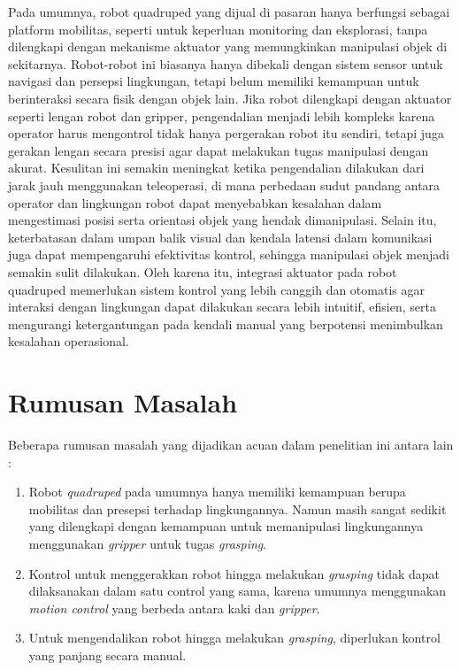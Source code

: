 Pada umumnya, robot quadruped yang dijual di pasaran hanya berfungsi sebagai platform mobilitas,
seperti untuk keperluan monitoring dan eksplorasi, tanpa dilengkapi dengan mekanisme aktuator
yang memungkinkan manipulasi objek di sekitarnya. Robot-robot ini biasanya hanya dibekali
dengan sistem sensor untuk navigasi dan persepsi lingkungan, tetapi belum memiliki kemampuan
untuk berinteraksi secara fisik dengan objek lain. Jika robot dilengkapi dengan aktuator
seperti lengan robot dan gripper, pengendalian menjadi lebih kompleks karena operator harus
mengontrol tidak hanya pergerakan robot itu sendiri, tetapi juga gerakan lengan secara presisi
agar dapat melakukan tugas manipulasi dengan akurat. Kesulitan ini semakin meningkat ketika
pengendalian dilakukan dari jarak jauh menggunakan teleoperasi, di mana perbedaan sudut pandang
antara operator dan lingkungan robot dapat menyebabkan kesalahan dalam mengestimasi posisi serta
orientasi objek yang hendak dimanipulasi. Selain itu, keterbatasan dalam umpan balik visual
dan kendala latensi dalam komunikasi juga dapat mempengaruhi efektivitas kontrol,
sehingga manipulasi objek menjadi semakin sulit dilakukan. Oleh karena itu, integrasi aktuator
pada robot quadruped memerlukan sistem kontrol yang lebih canggih dan otomatis agar
interaksi dengan lingkungan dapat dilakukan secara lebih intuitif, efisien, serta
mengurangi ketergantungan pada kendali manual yang berpotensi menimbulkan kesalahan operasional.

\section{Rumusan Masalah}

Beberapa rumusan masalah yang dijadikan acuan dalam penelitian ini antara lain :

\begin{enumerate}
    \item Robot \emph{quadruped} pada umumnya hanya memiliki kemampuan berupa mobilitas
    dan presepsi terhadap lingkungannya. Namun masih sangat sedikit yang dilengkapi
    dengan kemampuan untuk memanipulasi lingkungannya menggunakan \emph{gripper} untuk tugas \emph{grasping}.
    \item Kontrol untuk menggerakkan robot hingga melakukan \emph{grasping} tidak dapat dilaksanakan dalam
    satu control yang sama, karena umumnya menggunakan \emph{motion control} yang berbeda antara kaki dan \emph{gripper}.
    \item Untuk mengendalikan robot hingga melakukan \emph{grasping}, diperlukan kontrol yang panjang secara manual.

\end{enumerate}

